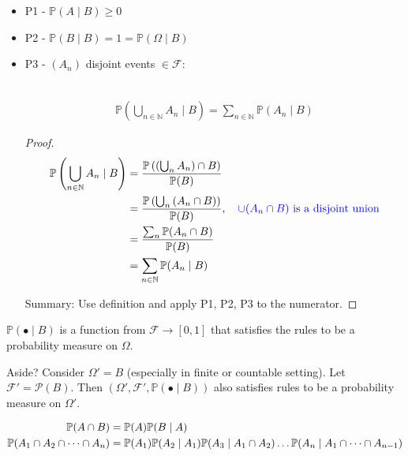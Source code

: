 \begin{itemize}
    \item P1 - $\mathbb{P}(A \mid B) \geq 0$ 
    \item P2 - $\mathbb{P}(B \mid B) = 1 = \mathbb{P}(\Omega \mid B)$
    \item P3 - $(A_n)$ disjoint events $\in \mathcal{F}$:
    \begin{claim} ~\vspace*{-1.5\baselineskip}
        \begin{align*}
            \mathbb{P}\left(\bigcup_{n \in \mathbb{N}} A_n \mid B\right) = \sum_{n \in \mathbb{N}} \mathbb{P}(A_n \mid B)
        \end{align*} 
    \end{claim} 

    \begin{proof}
        \begin{align*}
            \mathbb{P}\left(\bigcup_{n \in \mathbb{N}} A_n \mid B\right) &= \frac{\mathbb{P}\left( \left( \bigcup_n A_n \right) \cap B \right)}{\mathbb{P}(B)} \\
            &= \frac{\mathbb{P}\left( \bigcup_n \left(A_n \cap B \right) \right)}{\mathbb{P}(B)}, \quad \mathcolor{blue}{\cup (A_n \cap B) \text{ is a disjoint union}} \\
            &= \frac{\sum_n \mathbb{P}(A_n \cap B)}{\mathbb{P}(B)} \\
            &= \sum_{n \in \mathbb{N}} \mathbb{P}(A_n \mid B)
        \end{align*} 

        Summary: Use definition and apply P1, P2, P3 to the numerator.
    \end{proof} 
\end{itemize} 

$\mathbb{P}(\bullet \mid B)$ is a function from $\mathcal{F} \to [0, 1]$ that satisfies the rules to be a probability measure on $\Omega$.

\begin{aside}{Aside?}
    Consider $\Omega' = B$ (especially in finite or countable setting).
    Let $\mathcal{F}' = \mathcal{P}(B)$.
    Then $\left(\Omega', \mathcal{F}', \mathbb{P}(\bullet \mid B)\right)$ also satisfies rules to be a probability measure on $\Omega'$.
\end{aside} 

\begin{align}
    \mathbb{P}(A \cap B) &= \mathbb{P}(A) \mathbb{P}(B \mid A) \label{eq:union} \\
    \mathbb{P}(A_1 \cap A_2 \cap \dots \cap A_n) &= \mathbb{P}(A_1) \mathbb{P}(A_2 \mid A_1) \mathbb{P}(A_3 \mid A_1 \cap A_2) \dots \mathbb{P}(A_n \mid A_1 \cap \dots \cap A_{n - 1}) \notag
\end{align} 

